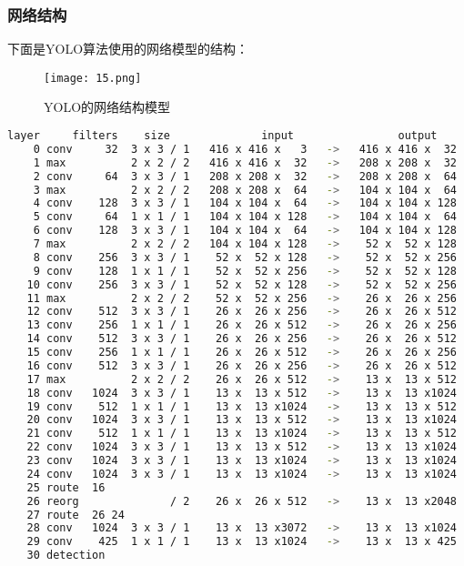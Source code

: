 \documentclass[openany]{ctexbook}
\begin{document}
\subsubsection{网络结构}
下面是YOLO算法使用的网络模型的结构：
\begin{figure}[h]
  \centering
  \texttt{[image: 15.png]}
  \caption{YOLO的网络结构模型}
\end{figure}
{\setmainfont{Courier New Bold}                          %
\begin{lstlisting}[language=bash]
layer     filters    size              input                output
    0 conv     32  3 x 3 / 1   416 x 416 x   3   ->   416 x 416 x  32
    1 max          2 x 2 / 2   416 x 416 x  32   ->   208 x 208 x  32
    2 conv     64  3 x 3 / 1   208 x 208 x  32   ->   208 x 208 x  64
    3 max          2 x 2 / 2   208 x 208 x  64   ->   104 x 104 x  64
    4 conv    128  3 x 3 / 1   104 x 104 x  64   ->   104 x 104 x 128
    5 conv     64  1 x 1 / 1   104 x 104 x 128   ->   104 x 104 x  64
    6 conv    128  3 x 3 / 1   104 x 104 x  64   ->   104 x 104 x 128
    7 max          2 x 2 / 2   104 x 104 x 128   ->    52 x  52 x 128
    8 conv    256  3 x 3 / 1    52 x  52 x 128   ->    52 x  52 x 256
    9 conv    128  1 x 1 / 1    52 x  52 x 256   ->    52 x  52 x 128
   10 conv    256  3 x 3 / 1    52 x  52 x 128   ->    52 x  52 x 256
   11 max          2 x 2 / 2    52 x  52 x 256   ->    26 x  26 x 256
   12 conv    512  3 x 3 / 1    26 x  26 x 256   ->    26 x  26 x 512
   13 conv    256  1 x 1 / 1    26 x  26 x 512   ->    26 x  26 x 256
   14 conv    512  3 x 3 / 1    26 x  26 x 256   ->    26 x  26 x 512
   15 conv    256  1 x 1 / 1    26 x  26 x 512   ->    26 x  26 x 256
   16 conv    512  3 x 3 / 1    26 x  26 x 256   ->    26 x  26 x 512
   17 max          2 x 2 / 2    26 x  26 x 512   ->    13 x  13 x 512
   18 conv   1024  3 x 3 / 1    13 x  13 x 512   ->    13 x  13 x1024
   19 conv    512  1 x 1 / 1    13 x  13 x1024   ->    13 x  13 x 512
   20 conv   1024  3 x 3 / 1    13 x  13 x 512   ->    13 x  13 x1024
   21 conv    512  1 x 1 / 1    13 x  13 x1024   ->    13 x  13 x 512
   22 conv   1024  3 x 3 / 1    13 x  13 x 512   ->    13 x  13 x1024
   23 conv   1024  3 x 3 / 1    13 x  13 x1024   ->    13 x  13 x1024
   24 conv   1024  3 x 3 / 1    13 x  13 x1024   ->    13 x  13 x1024
   25 route  16
   26 reorg              / 2    26 x  26 x 512   ->    13 x  13 x2048
   27 route  26 24
   28 conv   1024  3 x 3 / 1    13 x  13 x3072   ->    13 x  13 x1024
   29 conv    425  1 x 1 / 1    13 x  13 x1024   ->    13 x  13 x 425
   30 detection
\end{lstlisting}}
\end{document}
